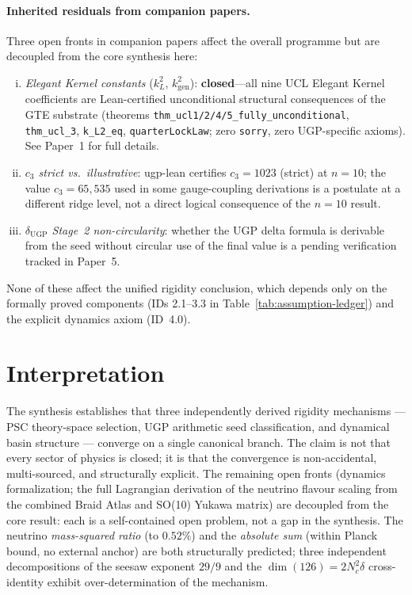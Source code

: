 \documentclass[11pt,twocolumn]{article}
\theoremstyle{remark}
\begin{document}
\paragraph{Inherited residuals from companion papers.}
Three open fronts in companion papers affect the overall programme but are decoupled from
the core synthesis here:
\begin{enumerate}[(i)]
  \item \emph{Elegant Kernel constants} ($k_L^2$, $k_{\mathrm{gen}}^2$): \textbf{closed}---all nine UCL Elegant Kernel coefficients are Lean-certified unconditional structural consequences of the GTE substrate (theorems \texttt{thm\_ucl1/2/4/5\_fully\_unconditional}, \texttt{thm\_ucl\_3}, \texttt{k\_L2\_eq}, \texttt{quarterLockLaw}; zero \texttt{sorry}, zero UGP-specific axioms).  See Paper~1 for full details.
  \item \emph{$c_3$ strict vs.\ illustrative}: ugp-lean certifies
    $c_3 = 1023$ (strict) at $n=10$; the value $c_3 = 65{,}535$ used in some gauge-coupling
    derivations is a postulate at a different ridge level, not a direct logical consequence
    of the $n=10$ result.
  \item \emph{$\delta_{\mathrm{UGP}}$ Stage~2 non-circularity}: whether the UGP delta formula
    is derivable from the seed without circular use of the final value is a pending
    verification tracked in Paper~5.
\end{enumerate}
None of these affect the unified rigidity conclusion, which depends only on the formally
proved components (IDs 2.1--3.3 in Table~\ref{tab:assumption-ledger}) and the explicit
dynamics axiom (ID~4.0).

\section{Interpretation}
The synthesis establishes that three independently derived rigidity mechanisms — PSC theory-space
selection, UGP arithmetic seed classification, and dynamical basin structure — converge on a
single canonical branch.
The claim is not that every sector of physics is closed; it is that the convergence is
non-accidental, multi-sourced, and structurally explicit.
The remaining open fronts (dynamics formalization; the full Lagrangian derivation of the neutrino flavour scaling from the combined Braid Atlas and SO(10) Yukawa matrix) are decoupled from the core result: each is a self-contained open problem, not a gap in the synthesis.  The neutrino \emph{mass-squared ratio} (to $0.52\%$) and the \emph{absolute sum} (within Planck bound, no external anchor) are both structurally predicted; three independent decompositions of the seesaw exponent $29/9$ and the $\dim(126) = 2 N_c^2 \delta$ cross-identity exhibit over-determination of the mechanism.
\end{document}
